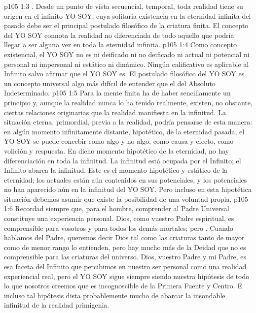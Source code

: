 \vs p105 1:3 \pc {}. Desde un punto de vista secuencial, temporal, toda realidad tiene su origen en el infinito YO SOY, cuya solitaria existencia en la eternidad infinita del pasado debe ser el principal postulado filosófico de la criatura finita. El concepto del YO SOY connota  la realidad no diferenciada de todo aquello que podría llegar a ser alguna vez en toda la eternidad infinita.
\vs p105 1:4 Como concepto existencial, el YO SOY no es ni deificado ni no deificado ni actual ni potencial ni personal ni impersonal ni estático ni dinámico. Ningún calificativo es aplicable al Infinito salvo afirmar que el YO SOY es. El postulado filosófico del YO SOY es un concepto universal algo más difícil de entender que el del Absoluto Indeterminado.
\vs p105 1:5 Para la mente finita ha de haber sencillamente un principio y, aunque la realidad nunca lo ha tenido realmente, existen, no obstante, ciertas relaciones originarias que la realidad manifiesta en la infinitud. La situación eterna, primordial, previa a la realidad, podría pensarse de esta manera: en algún momento infinitamente distante, hipotético, de la eternidad pasada, el YO SOY se puede concebir como algo y no algo, como causa y efecto, como volición y respuesta. En dicho momento hipotético de la eternidad, no hay diferenciación en toda la infinitud. La infinitud está ocupada por el Infinito; el Infinito abarca la infinitud. Este es el momento hipotético y estático de la eternidad; los actuales están aún contenidos en sus potenciales, y los potenciales no han aparecido aún en la infinitud del YO SOY. Pero incluso en esta hipotética situación debemos asumir que existe la posibilidad de una voluntad propia.
\vs p105 1:6 \pc Recordad siempre que, para el hombre, comprender al Padre Universal constituye una experiencia personal. Dios, como vuestro Padre espiritual, es comprensible para vosotros y para todos los demás mortales; pero . Cuando hablamos del Padre, queremos decir Dios tal como las criaturas tanto de mayor como de menor rango lo entienden, pero hay mucho más de la Deidad que no es comprensible para las criaturas del universo. Dios, vuestro Padre y mi Padre, es esa faceta del Infinito que percibimos en nuestro ser personal como una realidad experiencial real, pero el YO SOY sigue siempre siendo nuestra hipótesis de todo lo que nosotros creemos que es incognoscible de la Primera Fuente y Centro. E incluso tal hipótesis dista probablemente mucho de abarcar la insondable infinitud de la realidad primigenia.

